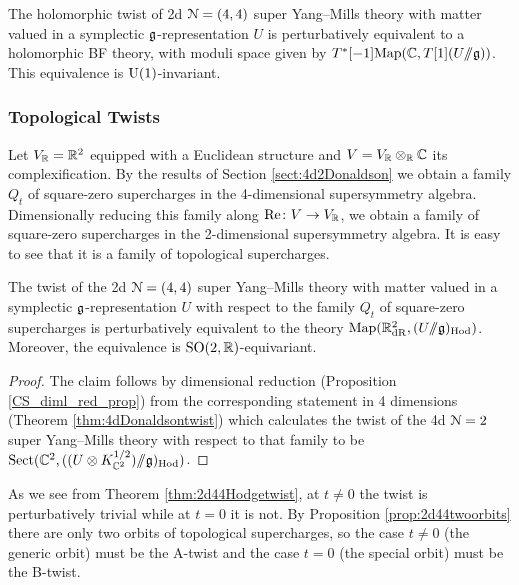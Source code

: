 \documentclass[10pt, oneside]{article}
\begin{document}
\begin{theorem}
The holomorphic twist of 2d $\mathcal{N}=(4,4)$ super Yang--Mills theory with matter valued in a symplectic $\mathfrak g$-representation $U$ is perturbatively equivalent to a holomorphic BF theory, with moduli space given by $T^*[-1]\mathrm{Map}(\mathbb C, T[1](U /\!\!/ \mathfrak{g}))$. 
This equivalence is $\mathrm{U}(1)$-invariant.
\label{thm:2d44holomorphictwist}
\end{theorem}

\subsubsection{Topological Twists}
\label{sect:2d44Atwist}
\label{sect:2d44Btwist}

Let $V_\mathbb R=\mathbb R^2$ equipped with a Euclidean structure and $V=V_\mathbb R\otimes_\mathbb R\mathbb C$ its complexification. By the results of Section \ref{sect:4d2Donaldson} we obtain a family $Q_t$ of square-zero supercharges in the 4-dimensional supersymmetry algebra. Dimensionally reducing this family along $\mathrm{Re}\colon V\rightarrow V_\mathbb R$, we obtain a family of square-zero supercharges in the 2-dimensional supersymmetry algebra. It is easy to see that it is a family of topological supercharges.

\begin{theorem}
The twist of the 2d $\mathcal N=(4, 4)$ super Yang--Mills theory with matter valued in a symplectic $\mathfrak g$-representation $U$ with respect to the family $Q_t$ of square-zero supercharges is perturbatively equivalent to the theory $\operatorname{Map}(\mathbb R^2_{\mathrm{dR}}, (U/\!\!/ \mathfrak g)_{\mathrm{Hod}})$. Moreover, the equivalence is $\mathrm{SO}(2, \mathbb R)$-equivariant.
\label{thm:2d44Hodgetwist}
\end{theorem}
\begin{proof}
The claim follows by dimensional reduction (Proposition \ref{CS_diml_red_prop}) from the corresponding statement in 4 dimensions (Theorem \ref{thm:4dDonaldsontwist}) which calculates the twist of the 4d $\mathcal N=2$ super Yang--Mills theory with respect to that family to be $\mathrm{Sect}(\mathbb C^2, ((U\otimes K^{1/2}_{\mathbb C^2})/\!\!/ \mathfrak g)_{\mathrm{Hod}})$.
\end{proof}

As we see from Theorem \ref{thm:2d44Hodgetwist}, at $t\neq 0$ the twist is perturbatively trivial while at $t=0$ it is not. By Proposition \ref{prop:2d44twoorbits} there are only two orbits of topological supercharges, so the case $t\neq 0$ (the generic orbit) must be the A-twist and the case $t=0$ (the special orbit) must be the B-twist.
\end{document}
